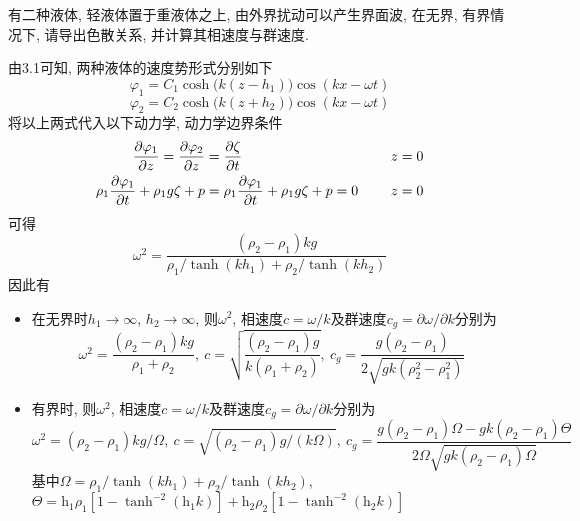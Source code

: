 \begin{problem}[习题3.2]
有二种液体, 轻液体置于重液体之上, 由外界扰动可以产生界面波, 在无界, 有界情况下, 请导出色散关系, 并计算其相速度与群速度.
\end{problem}

\begin{solution}
由3.1可知, 两种液体的速度势形式分别如下
\[
\varphi_{1}=C_{1}\cosh\big(k(z-h_{1})\big)\cos(kx-\omega t)
\]
\[
\varphi_{2}=C_{2}\cosh\big(k(z+h_{2})\big)\cos(kx-\omega t)
\]
将以上两式代入以下动力学, 动力学边界条件
\begin{align*}
\frac{\partial\varphi_{1}}{\partial z}=\frac{\partial\varphi_{2}}{\partial z} & =\frac{\partial\zeta}{\partial t}\hphantom{\rho_{1}\frac{\partial\varphi_{1}}{\partial t}+\rho_{1}g\zeta+p=0}\quad z=0\\
\rho_{1}\frac{\partial\varphi_{1}}{\partial t}+\rho_{1}g\zeta+p & =\rho_{1}\frac{\partial\varphi_{1}}{\partial t}+\rho_{1}g\zeta+p=0\hphantom{\frac{\partial\zeta}{\partial t}}\quad z=0
\end{align*}
可得
\[
\omega^{2}=\frac{(\rho_{2}-\rho_{1})kg}{\rho_{1}/\tanh(kh_{1})+\rho_{2}/\tanh(kh_{2})}
\]
因此有
\begin{itemize}
\item 在无界时$h_{1}\rightarrow\infty$, $h_{2}\rightarrow\infty$, 则$\omega^{2}$,
相速度$c=\omega/k$及群速度$c_{g}=\partial\omega/\partial k$分别为
\[
\omega^{2}=\frac{(\rho_{2}-\rho_{1})kg}{\rho_{1}+\rho_{2}},\: c=\sqrt{\frac{(\rho_{2}-\rho_{1})g}{k(\rho_{1}+\rho_{2})}},\: c_{g}=\frac{g(\rho_{2}-\rho_{1})}{2\sqrt{gk(\rho_{2}^{2}-\rho_{1}^{2})}}
\]

\item 有界时, 则$\omega^{2}$, 相速度$c=\omega/k$及群速度$c_{g}=\partial\omega/\partial k$分别为
\[
\omega^{2}=(\rho_{2}-\rho_{1})kg/\Omega,\: c=\sqrt{(\rho_{2}-\rho_{1})g/(k\Omega)},\: c_{g}=\frac{g(\rho_{2}-\rho_{1})\Omega-gk(\rho_{2}-\rho_{1})\Theta}{2\Omega\sqrt{gk(\rho_{2}-\rho_{1})\Omega}}
\]
基中$\Omega=\rho_{1}/\tanh(kh_{1})+\rho_{2}/\tanh(kh_{2})$, $\Theta=\mathrm{h_{1}}\rho_{1}[1-\tanh^{-2}(\mathrm{h_{1}}k)]+\mathrm{h_{2}}\rho_{2}[1-\tanh^{-2}(\mathrm{h_{2}}k)]$
\end{itemize}
\end{solution}

